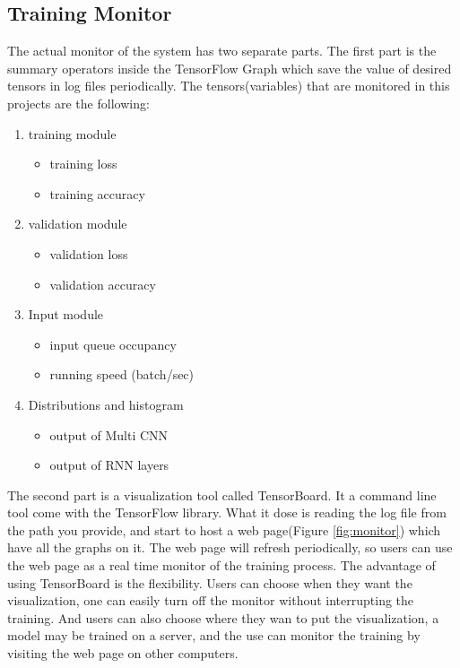 \subsection{Training Monitor}
The actual monitor of the system has two separate parts. The first part is the summary operators inside the TensorFlow Graph which save the value of desired tensors in log files periodically. The tensors(variables) that are monitored in this projects are the following:

\begin{multicols}{2}
  \begin{enumerate}
  \item training module
  \begin{itemize}
    \item training loss
    \item training accuracy
  \end{itemize} 
  
  \item validation module
  \begin{itemize}
    \item validation loss
    \item validation accuracy
  \end{itemize}
  
  \item Input module
  \begin{itemize}
      \item input queue occupancy
      \item running speed (batch/sec)
  \end{itemize}
  \item Distributions and histogram
  \begin{itemize}
      \item output of Multi CNN
      \item output of RNN layers
  \end{itemize}
  \end{enumerate}
\end{multicols}
The second part is a visualization tool called TensorBoard. It a command line tool come with the TensorFlow library. What it dose is reading the log file from the path you provide, and start to host a web page(Figure \ref{fig:monitor}) which have all the graphs on it. The web page will refresh periodically, so users can use the web page as a real time monitor of the training process. The advantage of using TensorBoard is the flexibility. Users can choose when they want the visualization, one can easily turn off the monitor without interrupting the training. And users can also choose where they wan to put the visualization, a model may be trained on a server, and the use can monitor the training by visiting the web page on other computers. 
